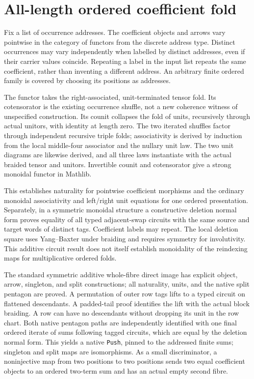 \documentclass{article}
\begin{document}
\section*{All-length ordered coefficient fold}
Fix a list of occurrence addresses. The coefficient objects and arrows
vary pointwise in the category of functors from the discrete address
type. Distinct occurrences may vary independently when labelled by
distinct addresses, even if their carrier values coincide. Repeating a
label in the input list repeats the same coefficient, rather than
inventing a different address. An arbitrary finite ordered family is
covered by choosing its positions as addresses.

The functor takes the right-associated, unit-terminated tensor fold.
Its cotensorator is the existing occurrence shuffle, not a new
coherence witness of unspecified construction. Its counit collapses the
fold of units, recursively through actual unitors, with identity at
length zero. The two iterated shuffles factor through independent
recursive triple folds; associativity is derived by induction from the
local middle-four associator and the nullary unit law. The two unit
diagrams are likewise derived, and all three laws instantiate with
the actual braided tensor and unitors. Invertible counit and
cotensorator give a strong monoidal functor in Mathlib.

This establishes naturality for pointwise coefficient morphisms and
the ordinary monoidal associativity and left/right unit equations for
one ordered presentation. Separately, in a symmetric monoidal
structure a constructive deletion normal form proves equality of
all typed adjacent-swap circuits with the same source and target words
of distinct tags. Coefficient labels may repeat. The local deletion
square uses Yang--Baxter under braiding and requires symmetry for
involutivity. This additive circuit result does not itself establish
monoidality of the reindexing maps for multiplicative ordered folds.

The standard symmetric additive whole-fibre direct image has explicit
object, arrow, singleton, and split constructions; all naturality,
units, and the native split pentagon are proved. A permutation of
outer row tags lifts to a typed circuit on flattened descendants.
A padded-tail proof identifies the lift with the actual block
braiding. A row can have no descendants without dropping its unit
in the row chart. Both native pentagon paths are independently
identified with one final ordered iterate of sums following tagged
circuits, which are equal by the deletion normal form. This yields a
native \texttt{Push}, pinned to the addressed finite sums; singleton
and split maps are isomorphisms. As a small discriminator, a
noninjective map from two positions to two positions sends two equal
coefficient objects to an ordered two-term sum and has an actual
empty second fibre.
\end{document}
